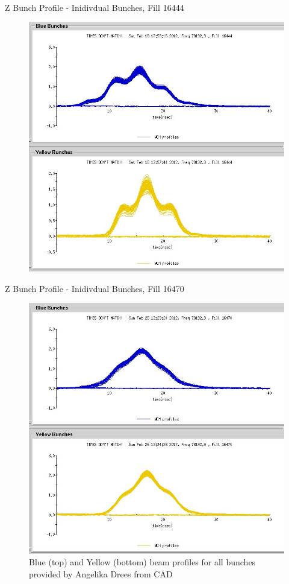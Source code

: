 \begin{frame}{Z Bunch Profile - Inidivdual Bunches, Fill 16444}
\begin{figure}
\begin{center}
\includegraphics[width=0.5\linewidth]{../ZBunchProfileStudies/figs/wcm_16444.jpeg}
\end{center}
\caption{ }
\label{fig:wcm_16444}
\end{figure}
\end{frame}

\begin{frame}{Z Bunch Profile - Inidivdual Bunches, Fill 16470}
\begin{figure}
\begin{center}
\includegraphics[width=0.5\linewidth]{../ZBunchProfileStudies/figs/wcm_16470.jpeg}
\end{center}
\caption{ Blue (top) and Yellow (bottom) beam profiles for all bunches provided by Angelika Drees from CAD}
\label{fig:wcm_16470}
\end{figure}
\end{frame}

